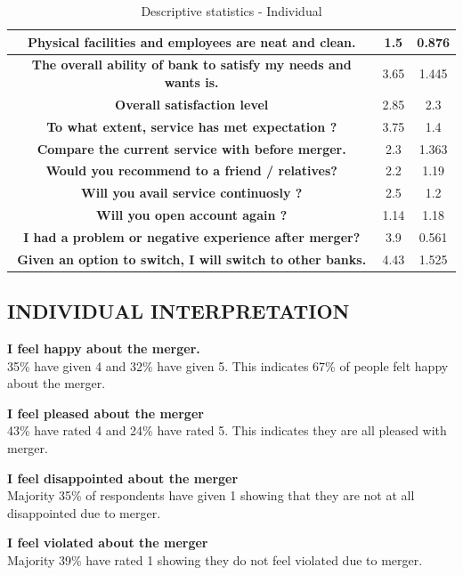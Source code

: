 \documentclass[a4paper, 12pt]{extarticle}
\begin{document}
{\begin{table}[H]
\begin{tabular}{|c|c|c|}
\hline
\textbf{ Physical facilities and employees are neat and clean.} & 1.5 & 0.876\\
\hline
\textbf{ The overall ability of bank to satisfy my needs and wants is.} & 3.65 & 1.445 \\
\hline
\textbf{ Overall satisfaction level} & 2.85 & 2.3 \\
\hline
\textbf{ To what extent, service has met expectation ?} & 3.75 & 1.4 \\
\hline
\textbf{ Compare the current service with before merger.} & 2.3 & 1.363 \\
\hline
\textbf{ Would you recommend to a friend / relatives?} & 2.2 & 1.19 \\
\hline
\textbf{ Will you avail service continuosly ?} & 2.5 & 1.2 \\
\hline
\textbf{ Will you open account again ?} & 1.14 & 1.18 \\
\hline
\textbf{ I had a problem or negative experience after merger?} & 3.9 & 0.561 \\
\hline
\textbf{ Given an option to switch, I will switch to other banks.} & 4.43 & 1.525 \\
\hline
\end{tabular}
\caption{Descriptive statistics - Individual}
\end{table}

\subsection{INDIVIDUAL INTERPRETATION}
 
\par \textbf{ I feel happy about the merger.} \\
35\% have given 4 and 32\% have given 5. This indicates 67\% of people felt happy about the merger.

\par \textbf{ I feel pleased about the merger} \\
43\% have rated 4 and 24\% have rated 5. This indicates they are all pleased with merger.\\

\par \textbf{ I feel disappointed about the merger } \\
Majority 35\% of respondents have given 1 showing that they are not at all disappointed due to merger.\\

\par \textbf{ I feel violated about the merger} \\
Majority 39\% have rated 1 showing they do not feel violated due to merger.\\

}
\end{document}
